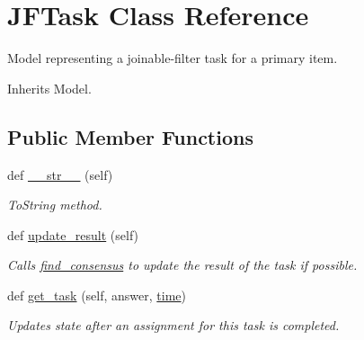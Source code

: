 \hypertarget{classjoinapp_1_1models_1_1task__management__models_1_1_j_f_task}{}\section{J\+F\+Task Class Reference}
\label{classjoinapp_1_1models_1_1task__management__models_1_1_j_f_task}


Model representing a joinable-\/filter task for a primary item.  




Inherits Model.

\subsection*{Public Member Functions}
\begin{DoxyCompactItemize}
\item 
def \mbox{\hyperlink{classjoinapp_1_1models_1_1task__management__models_1_1_j_f_task_a23e8041ce1015febe4fdace3225714f9}{\+\_\+\+\_\+str\+\_\+\+\_\+}} (self)
\begin{DoxyCompactList}\small\item\em To\+String method. \end{DoxyCompactList}\item 
def \mbox{\hyperlink{classjoinapp_1_1models_1_1task__management__models_1_1_j_f_task_a9013f18300fef58695383b65dd3ad816}{update\+\_\+result}} (self)
\begin{DoxyCompactList}\small\item\em Calls \mbox{\hyperlink{namespacejoinapp_1_1find__consensus}{find\+\_\+consensus}} to update the result of the task if possible. \end{DoxyCompactList}\item 
def \mbox{\hyperlink{classjoinapp_1_1models_1_1task__management__models_1_1_j_f_task_a5c2eb6f87a32af834dd29469a6189f0c}{get\+\_\+task}} (self, answer, \mbox{\hyperlink{classjoinapp_1_1models_1_1task__management__models_1_1_j_f_task_a70c092a6aebace0b1ea406e14da78a40}{time}})
\begin{DoxyCompactList}\small\item\em Updates state after an assignment for this task is completed. \end{DoxyCompactList}\end{DoxyCompactItemize}
